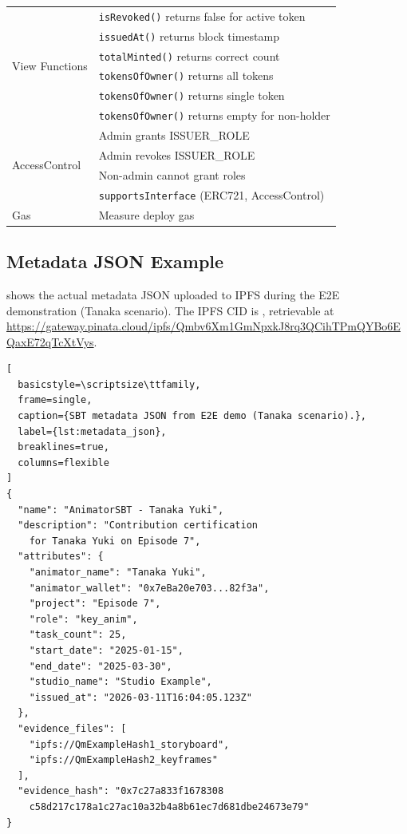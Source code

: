 \begin{table}[ht]
\begin{tabular}{@{}ll@{}}
\midrule
\multirow{6}{*}{View Functions}
  & \texttt{isRevoked()} returns false for active token \\
  & \texttt{issuedAt()} returns block timestamp \\
  & \texttt{totalMinted()} returns correct count \\
  & \texttt{tokensOfOwner()} returns all tokens \\
  & \texttt{tokensOfOwner()} returns single token \\
  & \texttt{tokensOfOwner()} returns empty for non-holder \\
\midrule
\multirow{4}{*}{AccessControl}
  & Admin grants ISSUER\_ROLE \\
  & Admin revokes ISSUER\_ROLE \\
  & Non-admin cannot grant roles \\
  & \texttt{supportsInterface} (ERC721, AccessControl) \\
\midrule
Gas & Measure deploy gas \\
\bottomrule
\end{tabular}
\end{table}

\subsection{Metadata JSON Example}
\label{app:metadata}

 shows the actual metadata JSON uploaded to IPFS
during the E2E demonstration (Tanaka scenario).
The IPFS CID is ,
retrievable at \url{https://gateway.pinata.cloud/ipfs/Qmbv6Xm1GmNpxkJ8rq3QCihTPmQYBo6EQaxE72qTcXtVys}.

\begin{lstlisting}[
  basicstyle=\scriptsize\ttfamily,
  frame=single,
  caption={SBT metadata JSON from E2E demo (Tanaka scenario).},
  label={lst:metadata_json},
  breaklines=true,
  columns=flexible
]
{
  "name": "AnimatorSBT - Tanaka Yuki",
  "description": "Contribution certification
    for Tanaka Yuki on Episode 7",
  "attributes": {
    "animator_name": "Tanaka Yuki",
    "animator_wallet": "0x7eBa20e703...82f3a",
    "project": "Episode 7",
    "role": "key_anim",
    "task_count": 25,
    "start_date": "2025-01-15",
    "end_date": "2025-03-30",
    "studio_name": "Studio Example",
    "issued_at": "2026-03-11T16:04:05.123Z"
  },
  "evidence_files": [
    "ipfs://QmExampleHash1_storyboard",
    "ipfs://QmExampleHash2_keyframes"
  ],
  "evidence_hash": "0x7c27a833f1678308
    c58d217c178a1c27ac10a32b4a8b61ec7d681dbe24673e79"
}
\end{lstlisting}


